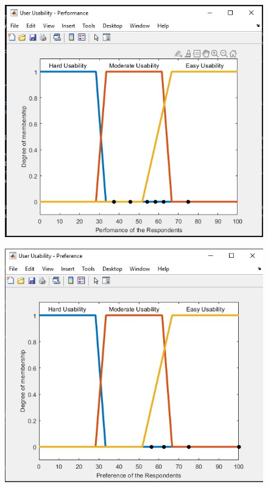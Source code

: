 \documentclass[12pt]{report} %
\begin{document}
		\begin{figure}[H]
			{\includegraphics[scale=0.6]{Figures/VisualPro-Survey-FuzzyLogic/RespondentsPerformance.jpg}}
		\end{figure}

		\begin{figure}[H]
			{\includegraphics[scale=0.6]{Figures/VisualPro-Survey-FuzzyLogic/RespondentsPreference.jpg}}
		\end{figure}
\end{document}
